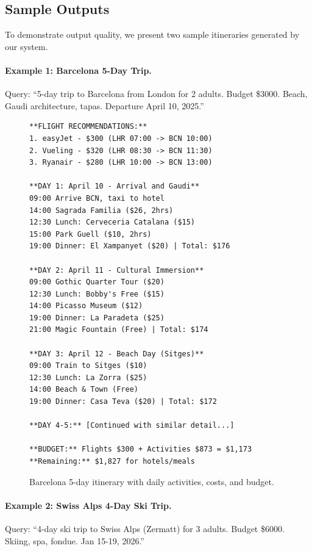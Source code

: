 \documentclass[conference]{IEEEtran}
\begin{document}
\subsection{Sample Outputs}
To demonstrate output quality, we present two sample itineraries generated by our system.

\paragraph{Example 1: Barcelona 5-Day Trip.}
Query: ``5-day trip to Barcelona from London for 2 adults. Budget \$3000. Beach, Gaudi architecture, tapas. Departure April 10, 2025.''

\begin{figure}[!htbp]
\scriptsize
\begin{verbatim}
**FLIGHT RECOMMENDATIONS:**
1. easyJet - $300 (LHR 07:00 -> BCN 10:00)
2. Vueling - $320 (LHR 08:30 -> BCN 11:30)  
3. Ryanair - $280 (LHR 10:00 -> BCN 13:00)

**DAY 1: April 10 - Arrival and Gaudi**
09:00 Arrive BCN, taxi to hotel
14:00 Sagrada Familia ($26, 2hrs)
12:30 Lunch: Cerveceria Catalana ($15)
15:00 Park Guell ($10, 2hrs)  
19:00 Dinner: El Xampanyet ($20) | Total: $176

**DAY 2: April 11 - Cultural Immersion**
09:00 Gothic Quarter Tour ($20)
12:30 Lunch: Bobby's Free ($15)
14:00 Picasso Museum ($12)
19:00 Dinner: La Paradeta ($25)
21:00 Magic Fountain (Free) | Total: $174

**DAY 3: April 12 - Beach Day (Sitges)**
09:00 Train to Sitges ($10)
12:30 Lunch: La Zorra ($25)
14:00 Beach & Town (Free)
19:00 Dinner: Casa Teva ($20) | Total: $172

**DAY 4-5:** [Continued with similar detail...]

**BUDGET:** Flights $300 + Activities $873 = $1,173
**Remaining:** $1,827 for hotels/meals
\end{verbatim}
\caption{Barcelona 5-day itinerary with daily activities, costs, and budget.}
\label{fig:barcelona_output}
\end{figure}

\paragraph{Example 2: Swiss Alps 4-Day Ski Trip.}
Query: ``4-day ski trip to Swiss Alps (Zermatt) for 3 adults. Budget \$6000. Skiing, spa, fondue. Jan 15-19, 2026.''
\end{document}
